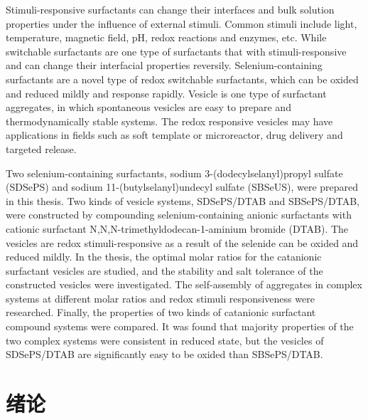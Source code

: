 \documentclass[bachelor,winfonts,replaceperiod]{jnuthesis}
\begin{document}
    \begin{englishabstract}
        Stimuli-responsive surfactants can change their interfaces and bulk solution properties under the influence of external stimuli.
        Common stimuli include light, temperature, magnetic field, pH, redox reactions and enzymes, etc. While switchable surfactants
        are one type of surfactants that with stimuli-responsive and can change their interfacial properties reversily. Selenium-containing surfactants are a novel type of redox switchable surfactants, which can be oxided and reduced mildly and response rapidly. 
        Vesicle is  one type of surfactant aggregates,  in which spontaneous vesicles are easy to prepare and thermodynamically stable
        systems. The redox responsive vesicles may have applications in fields such as soft template or microreactor, drug delivery
        and targeted release.
        
        Two selenium-containing surfactants, sodium 3-(dodecylselanyl)propyl sulfate (SDSePS) and sodium 
        11-(butylselanyl)undecyl sulfate (SBSeUS), were prepared in this thesis. Two kinds of vesicle systems, SDSePS/DTAB and
        SBSePS/DTAB, were constructed by compounding selenium-containing anionic surfactants with cationic surfactant N,N,N-trimethyldodecan-1-aminium bromide (DTAB). The vesicles are redox
        stimuli-responsive as a result of the selenide can be oxided and reduced mildly. In the thesis, the optimal molar ratios for the 
        catanionic surfactant vesicles are studied, and the stability and salt tolerance of the constructed vesicles were investigated.
        The self-assembly of aggregates in complex systems at different molar ratios and  redox stimuli responsiveness were researched. 
        Finally, the properties of two kinds of catanionic surfactant compound systems were compared. It was found that majority properties
        of the two complex systems were consistent in reduced state, but the vesicles of SDSePS/DTAB are significantly easy  to be oxided than SBSePS/DTAB.
    \end{englishabstract}
    
    \tableofcontents
    
    \mainmatter
    
    \chapter{绪论}\label{chapter:introduction}
\end{document}
